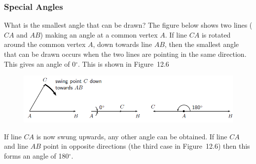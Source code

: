             \subsubsection{ Special Angles}
            \nopagebreak
        \label{m39370*id314513}What is the smallest angle that can be drawn? The figure below shows two lines ($CA$ and \begin{math}AB\end{math}) making an angle at a common vertex \begin{math}A\end{math}. If line \begin{math}CA\end{math} is rotated around the common vertex \begin{math}A\end{math}, down towards line \begin{math}AB\end{math}, then the smallest angle that can be drawn occurs when the two lines are pointing in the same direction. This gives an angle of 0\begin{math}{}^{\circ }\end{math}. This is shown in Figure~12.6\par 
        \label{m39370*id314590}
    \setcounter{subfigure}{0}
	\begin{figure}[H] %
    \begin{center}
    \label{m39370*id314593!!!underscore!!!media}\label{m39370*id314593!!!underscore!!!printimage}\includegraphics{col11306.imgs/m39370_MG10C13_006.png} %
      \vspace{2pt}
    \vspace{.1in}
    \end{center}
 \end{figure}       
        \par 
        \label{m39370*id314599}If line $CA$ is now swung upwards, any other angle can be obtained. If line \begin{math}CA\end{math} and line \begin{math}AB\end{math} point in opposite directions (the third case in Figure~12.6) then this forms an angle of 180\begin{math}{}^{\circ }\end{math}.\par 
